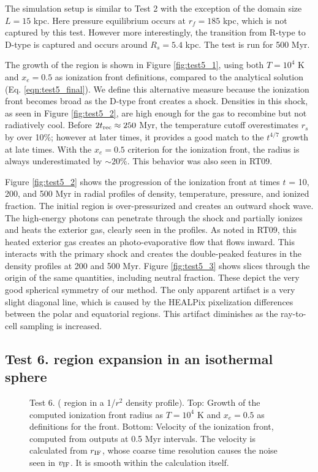 \documentclass[apj,onecolumn]{emulateapj}
\begin{document}
The simulation setup is similar to Test 2 with the exception of the
domain size $L = 15$ kpc.  Here pressure equilibrium occurs at $r_f =
185$ kpc, which is not captured by this test.  However more
interestingly, the transition from R-type to D-type is captured and
occurs around $R_s = 5.4$ kpc.  The test is run for 500 Myr.

The growth of the  region is shown in Figure
\ref{fig:test5_1}, using both $T = 10^4$ K and $x_e = 0.5$ as
ionization front definitions, compared to the analytical solution
(Eq. \ref{eqn:test5_final}).  We define this alternative measure
because the ionization front becomes broad as the D-type front creates
a shock.  Densities in this shock, as seen in Figure
\ref{fig:test5_2}, are high enough for the gas to recombine but not
radiatively cool.  Before $2t_{\rm rec} \approx 250$ Myr, the
temperature cutoff overestimates $r_s$ by over 10\%; however at later
times, it provides a good match to the $t^{4/7}$ growth at late times.
With the $x_e = 0.5$ criterion for the ionization front, the radius is
always underestimated by $\sim20\%$.  This behavior was also seen in
RT09.

Figure \ref{fig:test5_2} shows the progression of the ionization front
at times $t$ = 10, 200, and 500 Myr in radial profiles of density,
temperature, pressure, and ionized fraction.  The initial 
region is over-pressurized and creates an outward shock wave.  The
high-energy photons can penetrate through the shock and partially
ionizes and heats the exterior gas, clearly seen in the profiles.  As
noted in RT09, this heated exterior gas creates an photo-evaporative
flow that flows inward.  This interacts with the primary shock and
creates the double-peaked features in the density profiles at 200 and
500 Myr.  Figure \ref{fig:test5_3} shows slices through the origin of
the same quantities, including neutral fraction.  These depict the
very good spherical symmetry of our method.  The only apparent
artifact is a very slight diagonal line, which is caused by the
HEALPix pixelization differences between the polar and equatorial
regions.  This artifact diminishes as the ray-to-cell sampling is
increased.

\subsection{Test 6.  region expansion in an isothermal
  sphere}

\begin{figure}[t]
  \caption{\label{fig:test6_1} Test 6. ( region in a 1/$r^2$
    density profile).  Top: Growth of the computed ionization front
    radius as $T=10^4$ K and $x_e = 0.5$ as definitions for the front.
    Bottom: Velocity of the ionization front, computed from outputs at
    0.5 Myr intervals.  The velocity is calculated from $r_{\rm IF}$,
    whose coarse time resolution causes the noise seen in $v_{\rm
      IF}$.  It is smooth within the calculation itself.}
\end{figure}
\end{document}
